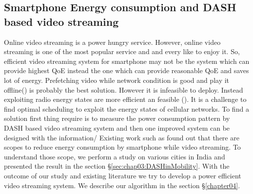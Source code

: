 \subsection{Smartphone Energy consumption and DASH based video streaming}
Online video streaming is a power hungry service. However, online video streaming is one of the most popular service and and every like to enjoy it. So, efficient video streaming system for smartphone may not be the system which can provide highest QoE instead the one which can provide reasonable QoE and saves lot of energy. Prefetching video while network condition is good and play it offline(\cite{6681586,10.1145/2079296.2079321}) is probably the best solution. However it is infeasible to deploy. Instead exploiting radio energy states are more efficient an feasible (\cite{7218493}). It is a challenge to find optimal scheduling to exploit the energy states of cellular networks. To find a solution first thing require is to measure the power consumption pattern by DASH based video streaming system and then one improved system can be designed with the information/ Existing work such as \cite{10.1145/2910018.2910656} found out that there are scopes to reduce energy consumption by smartphone while video streaming. To understand those scope, we perform a study on various cities in India and presented the result in the section \S\ref{sec:chap03:DASHinMobility}. With the outcome of our study and existing literature we try to develop a power efficient video streaming system. We describe our algorithm in the section \S\ref{chapter04}.

